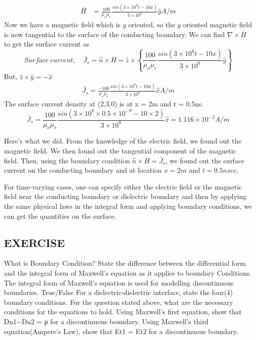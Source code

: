 \begin{exmp}
\begin{align*}
\bar{H} &= \frac{100}{\mu_o\mu_r}\frac{sin(3\times 10^8t -10x)}{3\times 10^8}\hat{y} A/m
\end{align*}
Now we have a magnetic field which is $y$ oriented, so the $y$ oriented magnetic field is now tangential to the surface of the conducting boundary. We can find $\nabla\times\bar{H}$ to get the surface current as
\begin{dmath*}
Surface\ current,\quad \bar{J}_s = \hat{n}\times\bar{H} = \hat{z}\times \left\lbrace \frac{100}{\mu_o\mu_r}\frac{sin(3\times 10^8t -10x)}{3\times 10^8}\hat{y} \right\rbrace  
\end{dmath*}
But, $\hat{z}\times\hat{y} = -\hat{x}$
\begin{align*}
\bar{J}_s = \frac{-100}{\mu_o\mu_r}\frac{sin(3\times 10^8t -10x)}{3\times 10^8}\hat{x} A/m
\end{align*}
The surface current density at (2,3,0) is at x = 2m and t = 0.5ns.
\begin{dmath*}
\bar{J}_s = \frac{100}{\mu_o\mu_r}\frac{sin(3\times 10^8\times 0.5 \times 10^{-9} - 10\times 2)}{3\times 10^8}\hat{x} = 1.116\times 10^{-2} A/m
\end{dmath*}
\end{exmp} 
Here's what we did. From the knowledge of the electric field, we found out the magnetic field. We then found out the tangential component of the magnetic field. Then, using the boundary condition $\hat{n}\times\bar{H} = \bar{J}_s$, we found out the surface current on the conducting boundary and at location $x = 2m$ and $t = 0.5nsec$.

For time-varying cases, one can specify either the electric field or the magnetic field near the conducting boundary or dielectric boundary and then by applying the same physical laws in the integral form and applying boundary conditions, we can get the quantities on the surface.


\begin{mdframed}[backgroundcolor=lightblue, linewidth=1pt, hidealllines=true]
	\section{EXERCISE}
	\begin{ExerciseList}
			\Exercise[label={ex11}] What is Boundary Condition?
			\Exercise[label={ex12}] State the difference between the differential form and the integral form of Maxwell's equation as it applies to boundary Conditions.
			\Exercise[label={ex13}] The integral form of Maxwell's equation is used for modelling discontinuous boundaries. True/False
			\Exercise[label={ex14}] For a dielectric-dielectric interface, state the four(4) boundary conditions.
			\Exercise[label={ex15}] For the question stated above, what are the necessary conditions for the equations to hold.
			\Exercise[label={ex16}] Using Maxwell's first equation, show that Dn1−Dn2 = ρ for a discontinuous boundary.
			\Exercise[label={ex17}] Using Maxwell's third equation(Ampere's Law), show that Et1 = Et2 for a discontinuous boundary.
		\end{ExerciseList}
\end{mdframed}